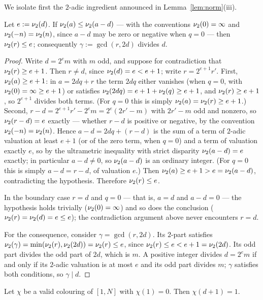 We isolate first the $2$-adic ingredient announced in
Lemma~\ref{lem:norm}(iii).

\begin{lemma}\label{lem:2adic-a}
Let $e := \nu_2(d)$. If $\nu_2(a) \le \nu_2(a-d)$ --- with the conventions
$\nu_2(0) = \infty$ and $\nu_2(-n) = \nu_2(n)$, since $a - d$ may be zero or
negative when $q = 0$ --- then $\nu_2(r) \le e$; consequently
$\gamma := \gcd(r, 2d)$ divides $d$.
\end{lemma}

\begin{proof}
Write $d = 2^e m$ with $m$ odd, and suppose for contradiction that
$\nu_2(r) \ge e+1$. Then $r \ne d$, since $\nu_2(d) = e < e+1$; write
$r = 2^{e+1} r'$. First, $\nu_2(a) \ge e+1$: in $a = 2dq + r$ the term
$2dq$ either vanishes (when $q = 0$, with $\nu_2(0) = \infty \ge e+1$) or
satisfies $\nu_2(2dq) = e + 1 + \nu_2(q) \ge e+1$, and $\nu_2(r) \ge e+1$,
so $2^{e+1}$ divides both terms. (For $q = 0$ this is simply
$\nu_2(a) = \nu_2(r) \ge e+1$.) Second,
$r - d = 2^{e+1} r' - 2^e m = 2^{e}(2r' - m)$ with $2r' - m$ odd and
nonzero, so $\nu_2(r - d) = e$ exactly --- whether $r - d$ is positive or
negative, by the convention $\nu_2(-n) = \nu_2(n)$. Hence
$a - d = 2dq + (r - d)$ is the sum of a term of $2$-adic valuation at least
$e+1$ (or of the zero term, when $q = 0$) and a term of valuation exactly
$e$, so by the ultrametric inequality with strict disparity
$\nu_2(a - d) = e$ exactly; in particular $a - d \ne 0$, so $\nu_2(a-d)$ is
an ordinary integer. (For $q = 0$ this is simply $a - d = r - d$, of
valuation $e$.) Then $\nu_2(a) \ge e+1 > e = \nu_2(a-d)$, contradicting the
hypothesis. Therefore $\nu_2(r) \le e$.

In the boundary case $r = d$ and $q = 0$ --- that is, $a = d$ and
$a - d = 0$ --- the hypothesis holds trivially ($\nu_2(0) = \infty$) and so
does the conclusion ($\nu_2(r) = \nu_2(d) = e \le e$); the contradiction
argument above never encounters $r = d$.

For the consequence, consider $\gamma = \gcd(r, 2d)$. Its $2$-part satisfies
$\nu_2(\gamma) = \min(\nu_2(r), \nu_2(2d)) = \nu_2(r) \le e$, since
$\nu_2(r) \le e < e + 1 = \nu_2(2d)$. Its odd part divides the odd part of
$2d$, which is $m$. A positive integer divides $d = 2^e m$ if and only if
its $2$-adic valuation is at most $e$ and its odd part divides $m$; $\gamma$
satisfies both conditions, so $\gamma \mid d$.
\end{proof}

\begin{lemma}\label{lem:ub1-first}
Let $\chi$ be a valid colouring of $[1,N]$ with $\chi(1) = 0$. Then
$\chi(d+1) = 1$.
\end{lemma}

